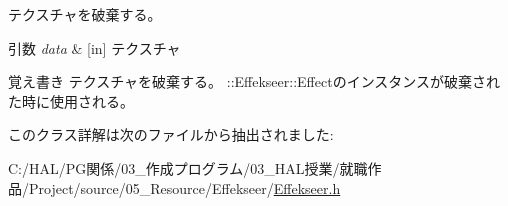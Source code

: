 テクスチャを破棄する。 


\begin{DoxyParams}{引数}
{\em data} & \mbox{[}in\mbox{]} テクスチャ \\
\hline
\end{DoxyParams}
\begin{DoxyNote}{覚え書き}
テクスチャを破棄する。 \+::\+Effekseer\+::\+Effectのインスタンスが破棄された時に使用される。 
\end{DoxyNote}


このクラス詳解は次のファイルから抽出されました\+:\begin{DoxyCompactItemize}
\item 
C\+:/\+H\+A\+L/\+P\+G関係/03\+\_\+作成プログラム/03\+\_\+\+H\+A\+L授業/就職作品/\+Project/source/05\+\_\+\+Resource/\+Effekseer/\mbox{\hyperlink{_effekseer_8h}{Effekseer.\+h}}\end{DoxyCompactItemize}
